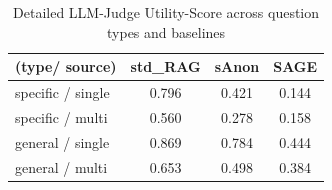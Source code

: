 \begin{table}[h!]
\centering
\caption{Detailed LLM-Judge Utility-Score across question types and baselines}
\label{evaluation-tab:utility-llm-details}
\begin{tabular}{l c c c}
\toprule
\textbf{(type/ source)} & \textbf{std\_RAG} & \textbf{sAnon} & \textbf{SAGE} \\
\midrule
specific / single & 0.796 & 0.421 & 0.144 \\
specific / multi & 0.560 & 0.278 & 0.158 \\
general / single & 0.869 & 0.784 & 0.444 \\
general / multi & 0.653 & 0.498 & 0.384 \\
\bottomrule
\end{tabular}
\end{table}
